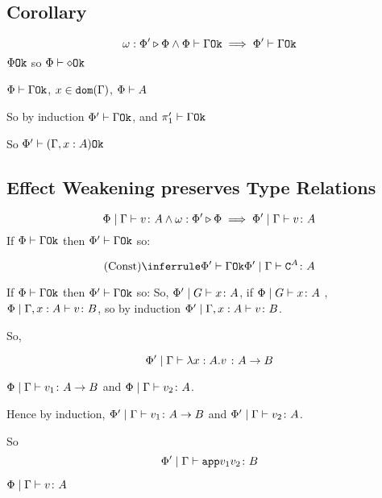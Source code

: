 {    \subsection{Corollary}
    $$\omega : \Phi' \triangleright \Phi\wedge \Phi\vdash \Gamma \texttt{Ok} \implies \Phi'\vdash \Gamma \texttt{Ok}$$
    \bi $\Phi \texttt{Ok}$ so $\Phi\vdash \diamond \texttt{Ok}$

    \bi $\Phi\vdash \Gamma \texttt{Ok}$, $x\in\texttt{dom}(\Gamma)$, $\Phi\vdash A$

    So by induction $\Phi'\vdash \Gamma \texttt{Ok}$, and $\pi_1'\vdash \Gamma \texttt{Ok}$

    So $\Phi'\vdash (\Gamma, x: A) \texttt{Ok}$
    
    \subsection{Effect Weakening preserves Type Relations}

    \begin{equation}
        \Phi\mid\Gamma \vdash v \colon A \wedge \omega : \Phi' \triangleright \Phi \implies \Phi'\mid\Gamma \vdash v \colon A
    \end{equation}
    \proof
    If $\Phi\vdash \Gamma \texttt{Ok}$ then $\Phi'\vdash \Gamma \texttt{Ok}$ so:

    \begin{equation}
        \ntreeruleI{Const}{\wellformedok{\P'}{\G}}{\etyperelation{\P'}{\G}{\const{A}}{A}}
    \end{equation}

    If $\Phi\vdash \Gamma \texttt{Ok}$ then $\Phi'\vdash \Gamma \texttt{Ok}$ so:
    So, $\Phi'\mid G \vdash x \colon A$, if $\Phi\mid G \vdash x \colon A$
    \bi, $\Phi\mid\Gamma, x: A \vdash v \colon B$, so by induction $\Phi'\mid\Gamma, x: A \vdash v \colon B$.

    So,

    \begin{equation}
        \Phi'\mid\Gamma \vdash \lambda x : A. v\; \colon A\rightarrow B
    \end{equation}

    \bi $\Phi\mid\Gamma \vdash v_1 \colon A\rightarrow B$ and $\Phi\mid\Gamma \vdash v_2 \colon A$.

    Hence by induction,
    $\Phi'\mid\Gamma \vdash v_1 \colon A\rightarrow B$ and $\Phi'\mid\Gamma \vdash v_2 \colon A$.

    So $$\Phi'\mid\Gamma \vdash \texttt{app}{v_1}{v_2} \colon B$$


    \bi $\Phi\mid\Gamma \vdash v \colon A$ 
    
}
